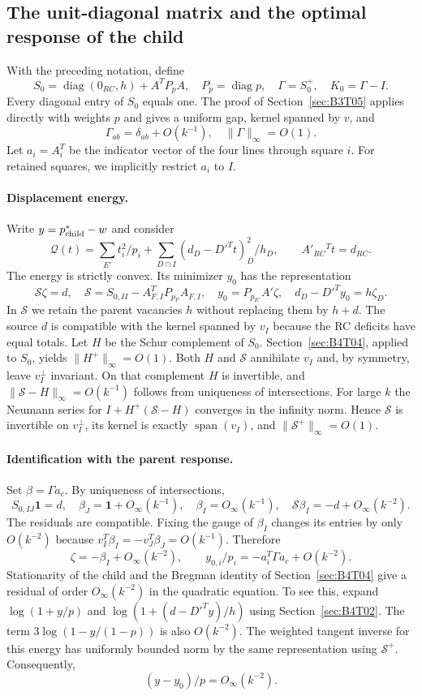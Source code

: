 \subsection{The unit-diagonal matrix and the optimal response of the child}\label{sec:B4T06}
With the preceding notation, define
\[
 S_0=\operatorname{diag}(0_{RC},h)+A^TP_pA,\quad
 P_p=\operatorname{diag}p,\quad \Gamma=S_0^+,\quad K_0=\Gamma-I.
\]
Every diagonal entry of $S_0$ equals one. The proof of Section~\ref{sec:B3T05} applies directly with weights
$p$ and gives a uniform gap, kernel spanned by $v$, and
\[
 \Gamma_{ab}=\delta_{ab}+O(k^{-1}),\quad \|\Gamma\|_\infty=O(1).
\]
Let $a_i=A_i^T$ be the indicator vector of the four lines through square $i$. For retained squares, we
implicitly restrict $a_i$ to $I$.

\paragraph{Displacement energy.}
Write $y=p^*_{\rm child}-w$ and consider
\[
 \mathcal Q(t)=\sum_{E'}t_i^2/p_i+
 \sum_{D\cap I}(d_D-D'^Tt)_D^2/h_D,
 \qquad A'_{RC}{}^Tt=d_{RC}.
\]
The energy is strictly convex. Its minimizer $y_0$ has the representation
\[
 \mathcal S\zeta=d,\quad
 \mathcal S=S_{0,II}-A_{F,I}^TP_{p_F}A_{F,I},\quad
 y_0=P_{p_{E'}}A'\zeta,\quad d_D-D'^Ty_0=h\zeta_D.
\]
In $\mathcal S$ we retain the parent vacancies $h$ without replacing them by $h+d$.
The source $d$ is compatible with the kernel spanned by $v_I$ because the RC deficits have equal totals. Let
$H$ be the Schur complement of $S_0$. Section~\ref{sec:B4T04}, applied to $S_0$, yields
$\|H^+\|_\infty=O(1)$. Both $H$ and $\mathcal S$ annihilate $v_I$ and, by symmetry, leave $v_I^\perp$
invariant.
On that complement $H$ is invertible, and $\|\mathcal S-H\|_\infty=O(k^{-1})$ follows from uniqueness of
intersections.
For large $k$ the Neumann series for $I+H^+(\mathcal S-H)$ converges in the infinity norm.
Hence $\mathcal S$ is invertible on $v_I^\perp$, its kernel is exactly $\operatorname{span}(v_I)$, and
$\|\mathcal S^+\|_\infty=O(1)$.

\paragraph{Identification with the parent response.}
Set $\beta=\Gamma a_c$. By uniqueness of intersections,
\[
 S_{0,IJ}\mathbf1=d,\quad \beta_J=\mathbf1+O_\infty(k^{-1}),
 \quad \beta_I=O_\infty(k^{-1}),\quad
 \mathcal S\beta_I=-d+O_\infty(k^{-2}).
\]
The residuals are compatible. Fixing the gauge of $\beta_I$ changes its entries by only $O(k^{-2})$ because
$v_I^T\beta_I=-v_J^T\beta_J=O(k^{-1})$.
Therefore
\[
 \zeta=-\beta_I+O_\infty(k^{-2}),\qquad
 \boxed{y_{0,i}/p_i=-a_i^T\Gamma a_c+O(k^{-2}).}
\]
Stationarity of the child and the Bregman identity of Section~\ref{sec:B4T04} give a residual of order
$O_\infty(k^{-2})$ in the quadratic equation. To see this, expand $\log(1+y/p)$ and $\log(1+(d-D'^Ty)/h)$
using Section~\ref{sec:B4T02}.
The term $3\log(1-y/(1-p))$ is also $O(k^{-2})$. The weighted tangent inverse for this energy has uniformly
bounded norm by the same representation using $\mathcal S^+$.
Consequently,
\[
 \boxed{(y-y_0)/p=O_\infty(k^{-2}).}
\]

